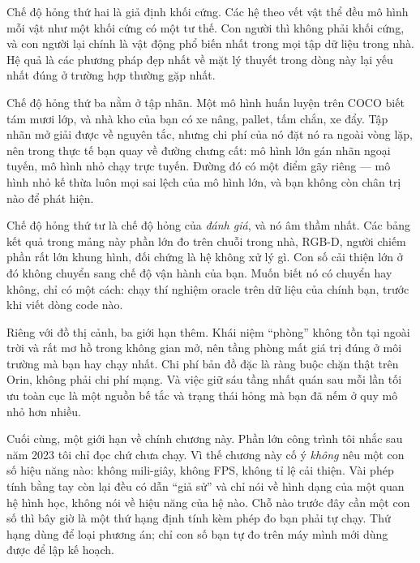 \documentclass[../../deep_learning.tex]{subfiles}
\begin{document}
Chế độ hỏng thứ hai là giả định khối cứng. Các hệ theo vết vật thể đều mô hình mỗi vật như một khối cứng có một tư thế. Con người thì không phải khối cứng, và con người lại chính là vật động phổ biến nhất trong mọi tập dữ liệu trong nhà. Hệ quả là các phương pháp đẹp nhất về mặt lý thuyết trong dòng này lại yếu nhất đúng ở trường hợp thường gặp nhất.

Chế độ hỏng thứ ba nằm ở tập nhãn. Một mô hình huấn luyện trên COCO biết tám mươi lớp, và nhà kho của bạn có xe nâng, pallet, tấm chắn, xe đẩy. Tập nhãn mở giải được về nguyên tắc, nhưng chi phí của nó đặt nó ra ngoài vòng lặp, nên trong thực tế bạn quay về đường chưng cất: mô hình lớn gán nhãn ngoại tuyến, mô hình nhỏ chạy trực tuyến. Đường đó có một điểm gãy riêng --- mô hình nhỏ kế thừa luôn mọi sai lệch của mô hình lớn, và bạn không còn chân trị nào để phát hiện.

Chế độ hỏng thứ tư là chế độ hỏng của \emph{đánh giá}, và nó âm thầm nhất. Các bảng kết quả trong mảng này phần lớn đo trên chuỗi trong nhà, RGB-D, người chiếm phần rất lớn khung hình, đối chứng là hệ không xử lý gì. Con số cải thiện lớn ở đó không chuyển sang chế độ vận hành của bạn. Muốn biết nó có chuyển hay không, chỉ có một cách: chạy thí nghiệm oracle trên dữ liệu của chính bạn, trước khi viết dòng code nào.

Riêng với đồ thị cảnh, ba giới hạn thêm. Khái niệm ``phòng'' không tồn tại ngoài trời và rất mơ hồ trong không gian mở, nên tầng phòng mất giá trị đúng ở môi trường mà bạn hay chạy nhất. Chi phí bản đồ đặc là ràng buộc chặn thật trên Orin, không phải chi phí mạng. Và việc giữ sáu tầng nhất quán sau mỗi lần tối ưu toàn cục là một nguồn bế tắc và trạng thái hỏng mà bạn đã nếm ở quy mô nhỏ hơn nhiều.

Cuối cùng, một giới hạn về chính chương này. Phần lớn công trình tôi nhắc sau năm 2023 tôi chỉ đọc chứ chưa chạy. Vì thế chương này cố ý \emph{không} nêu một con số hiệu năng nào: không mili-giây, không FPS, không tỉ lệ cải thiện. Vài phép tính bằng tay còn lại đều có dẫn ``giả sử'' và chỉ nói về hình dạng của một quan hệ hình học, không nói về hiệu năng của hệ nào. Chỗ nào trước đây cần một con số thì bây giờ là một thứ hạng định tính kèm phép đo bạn phải tự chạy. Thứ hạng dùng để loại phương án; chỉ con số bạn tự đo trên máy mình mới dùng được để lập kế hoạch.
\end{document}
